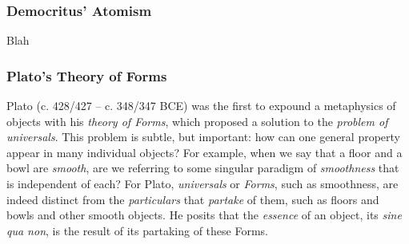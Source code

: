 

\subsubsection{Democritus' Atomism}

Blah


\subsubsection{Plato's Theory of Forms}


Plato (c. 428/427 -- c. 348/347 BCE) was the first to expound a metaphysics of objects with his \textit{theory of Forms}, which proposed a solution to the \textit{problem of universals}. This problem is subtle, but important: how can one general property appear in many individual objects? For example, when we say that a floor and a bowl are \textit{smooth}, are we referring to some singular paradigm of \textit{smoothness} that is independent of each? For Plato, \textit{universals} or \textit{Forms}, such as smoothness, are indeed distinct from the \textit{particulars} that \textit{partake} of them, such as floors and bowls and other smooth objects. He posits that the \textit{essence} of an object, its \textit{sine qua non}, is the result of its partaking of these Forms. \\

